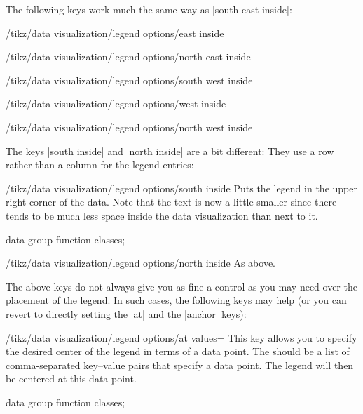 The following keys work much the same way as |south east inside|:

\begin{key}{/tikz/data visualization/legend options/east inside}
\end{key}
\begin{key}{/tikz/data visualization/legend options/north east inside}
\end{key}
\begin{key}{/tikz/data visualization/legend options/south west inside}
\end{key}
\begin{key}{/tikz/data visualization/legend options/west inside}
\end{key}
\begin{key}{/tikz/data visualization/legend options/north west inside}
\end{key}

The keys |south inside| and |north inside| are a bit different: They use a row
rather than a column for the legend entries:

\begin{key}{/tikz/data visualization/legend options/south inside}
  Puts the legend in the upper right corner of the data. Note that the
  text is now a little smaller since there tends to be much less space
  inside the data visualization than next to it.
\begin{codeexample}[width=8cm]
\tikz \datavisualization [
  scientific axes, 
  visualize as smooth line/.list={log, lin},
  legend=south inside,
  log=    {label in legend={text=$\log x$}},
  lin=    {label in legend={text=$x/2$}},
  style sheet=strong colors]
data group {function classes};
\end{codeexample}  
\end{key}

\begin{key}{/tikz/data visualization/legend options/north inside}
  As above.
\end{key}

The above keys do not always give you as fine a control as you may
need over the placement of the legend. In such cases, the following
keys may help (or you can revert to directly setting the |at| and the
|anchor| keys):

\begin{key}{/tikz/data visualization/legend options/at
    values=}
  This key allows you to specify the desired center of the legend in
  terms of a data point. The  should be a list of
  comma-separated key--value pairs that specify a data point. The
  legend will then be centered at this data point.
\begin{codeexample}[width=6cm]
\tikz \datavisualization [
  scientific axes, 
  visualize as smooth line/.list={log, lin},
  legend={at values={x=-1, y=2}},
  log=    {label in legend={text=$\log x$}},
  lin=    {label in legend={text=$x/2$}},
  style sheet=strong colors]
data group {function classes};
\end{codeexample}    
\end{key}

